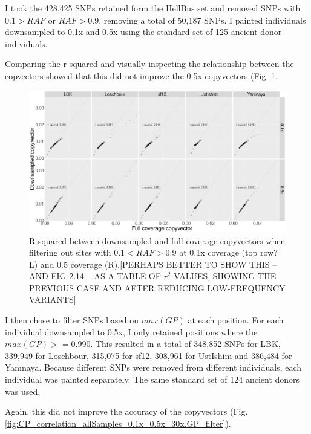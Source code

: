 I took the 428,425 SNPs retained form the HellBus set and removed SNPs with $0.1 > RAF$ or $RAF > 0.9$, removing a total of 50,187 SNPs. I painted individuals downsampled to 0.1x and 0.5x using the standard set of 125 ancient donor individuals. 

Comparing the r-squared and visually inspecting the relationship between the copvectors showed that this did not improve the 0.5x copyvectors (Fig.  \ref{fig:CP_correlation_allSamples_0.1x_0.5x_30x.RAF_filter}.


\begin{figure}[htp]
    \centering
    \includegraphics[width=1.0\textwidth]{../images/chapter1/CP_correlation_allSamples_0.1x_0.5x_30x.RAF_filter.png}
    \caption{R-squared between downsampled and full coverage copyvectors when filtering out sites with $0.1 < RAF > 0.9$ at 0.1x coverage ({\color{red}top row?}L) and 0.5 coverage (R).{\color{red}[PERHAPS BETTER TO SHOW THIS -- AND FIG 2.14 -- AS A TABLE OF $r^2$ VALUES, SHOWING THE PREVIOUS CASE AND AFTER REDUCING LOW-FREQUENCY VARIANTS]}}
    \label{fig:CP_correlation_allSamples_0.1x_0.5x_30x.RAF_filter}
\end{figure}
 
I then chose to filter SNPs based on $max(GP)$ at each position. For each individual downsampled to 0.5x, I only retained positions where the $max(GP) >= 0.990$. This resulted in a total of 348,852 SNPs for LBK, 339,949 for Loschbour, 315,075 for sf12, 308,961 for UstIshim and 386,484 for Yamnaya. Because different SNPs were removed from different individuals, each individual was painted separately. The same standard set of 124 ancient donors was used. 

Again, this did not improve the accuracy of the copyvectors (Fig. \ref{fig:CP_correlation_allSamples_0.1x_0.5x_30x.GP_filter}).


